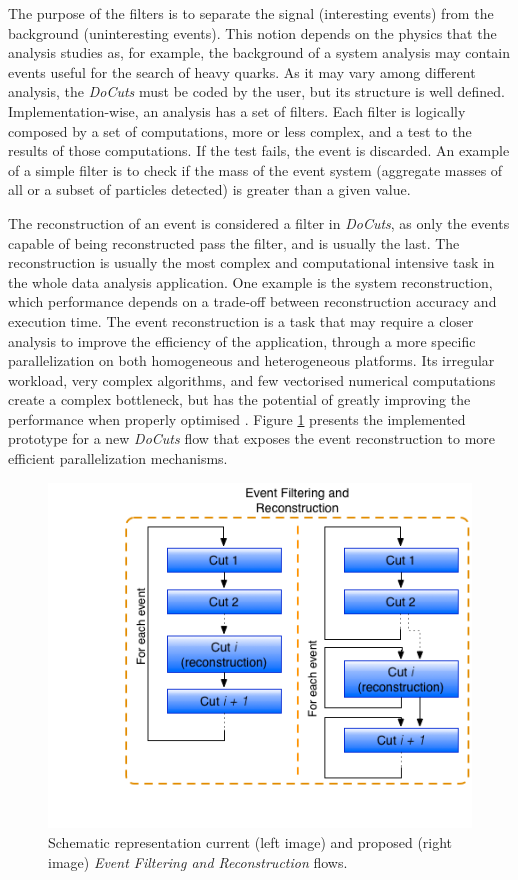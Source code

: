 The purpose of the filters is to separate the signal (interesting events) from the background (uninteresting events). This notion depends on the physics that the analysis studies as, for example, the background of a \ttH system analysis may contain events useful for the search of heavy quarks. As it may vary among different analysis, the \textit{DoCuts} must be coded by the user, but its structure is well defined. Implementation-wise, an analysis has a set of filters. Each filter is logically composed by a set of computations, more or less complex, and a test to the results of those computations. If the test fails, the event is discarded. An example of a simple filter is to check if the mass of the event system (aggregate masses of all or a subset of particles detected) is greater than a given value.

The reconstruction of an event is considered a filter in \textit{DoCuts}, as only the events capable of being reconstructed pass the filter, and is usually the last. The reconstruction is usually the most complex and computational intensive task in the whole data analysis application. One example is the \ttH system reconstruction, which performance depends on a trade-off between reconstruction accuracy and execution time. The event reconstruction is a task that may require a closer analysis to improve the efficiency of the application, through a more specific parallelization on both homogeneous and heterogeneous platforms. Its irregular workload, very complex algorithms, and few vectorised numerical computations create a complex bottleneck, but has the potential of greatly improving the performance when properly optimised \cite{paperAMP}. Figure \ref{fig:new_docuts} presents the implemented prototype for a new \textit{DoCuts} flow that exposes the event reconstruction to more efficient parallelization mechanisms.

\begin{figure}[!htp]
	\begin{center}
		\includegraphics[scale=0.5]{imgs/new_docuts.png}
		\caption{Schematic representation current (left image) and proposed (right image) \textit{Event Filtering and Reconstruction} flows.}
		\label{fig:new_docuts}
	\end{center}
\end{figure}


